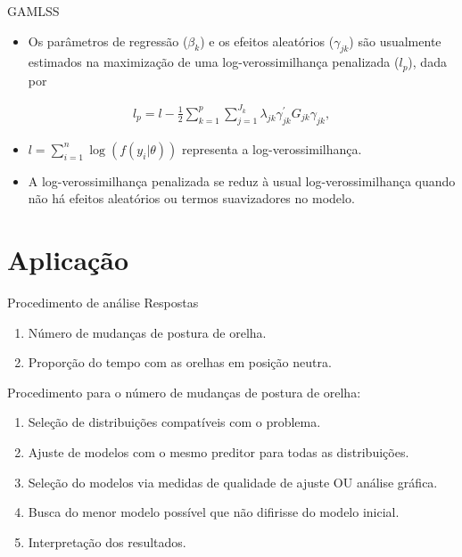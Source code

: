 \documentclass[
  ignorenonframetext,
  serif,
  professionalfont,
  usenames,
  dvipsnames,
  aspectratio = 169]{beamer}
\providecommand{\tightlist}{%
  \setlength{\itemsep}{0pt}\setlength{\parskip}{0pt}}
\renewcommand{\tightlist}{%
  \setlength{\itemsep}{0\baselineskip}
  \setlength{\parskip}{0.25\baselineskip}
}
\begin{document}
\begin{frame}{GAMLSS}
\protect\hypertarget{gamlss-5}{}
\begin{itemize}
\tightlist
\item
  Os parâmetros de regressão (\(\beta_{k}\)) e os efeitos aleatórios
  (\(\gamma_{jk}\)) são usualmente estimados na maximização de uma
  log-verossimilhança penalizada (\(l_p\)), dada por
\end{itemize}

\begin{equation}\label{eq.loglik}
    \begin{aligned}
        l_p = l-\frac{1}{2} \sum_{k=1}^{p} \sum_{j=1}^{J_k} \lambda_{jk} \gamma_{jk}^{'} G_{jk} \gamma_{jk},
    \end{aligned}
\end{equation}

\begin{itemize}
\item
  \(l = \sum_{i=1}^{n} \log(f(y_i|\theta))\) representa a
  log-verossimilhança.
\item
  A log-verossimilhança penalizada se reduz à usual log-verossimilhança
  quando não há efeitos aleatórios ou termos suavizadores no modelo.
\end{itemize}
\end{frame}

\hypertarget{aplicauxe7uxe3o}{%
\section{Aplicação}\label{aplicauxe7uxe3o}}

\begin{frame}{Procedimento de análise}
\protect\hypertarget{procedimento-de-anuxe1lise}{}
Respostas

\begin{enumerate}
\tightlist
\item
  Número de mudanças de postura de orelha.
\item
  Proporção do tempo com as orelhas em posição neutra.
\end{enumerate}

Procedimento para o número de mudanças de postura de orelha:

\begin{enumerate}
\tightlist
\item
  Seleção de distribuições compatíveis com o problema.
\item
  Ajuste de modelos com o mesmo preditor para todas as distribuições.
\item
  Seleção do modelos via medidas de qualidade de ajuste OU análise
  gráfica.
\item
  Busca do menor modelo possível que não difirisse do modelo inicial.
\item
  Interpretação dos resultados.
\end{enumerate}
\end{frame}
\end{document}
